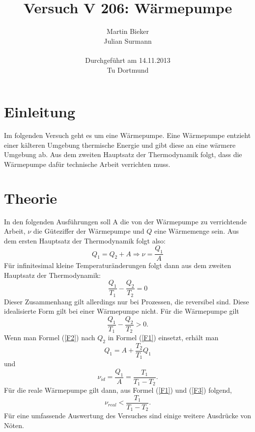 \documentclass[11pt]{article}
\title{\textbf{Versuch V 206: Wärmepumpe}}
\author{Martin Bieker\\
		Julian Surmann\\
		\\
		Durchgef\"{u}hrt am 14.11.2013\\
		Tu Dortmund}
\date{}
\begin{document}
\renewcommand\tablename{Tabelle}
\renewcommand\figurename{Abbildung}
\maketitle
\thispagestyle{empty}
\newpage
\clearpage
\setcounter{page}{1}


\section{Einleitung}
Im folgenden Versuch geht es um eine Wärmepumpe. Eine Wärmepumpe entzieht einer kälteren Umgebung thermische Energie und gibt diese an eine wärmere Umgebung ab. Aus dem zweiten Hauptsatz der Thermodynamik folgt, dass die Wärmepumpe dafür technische Arbeit verrichten muss.
\section{Theorie}
In den folgenden Ausführungen soll A die von der Wärmepumpe zu verrichtende Arbeit, $\nu$ die Güteziffer der Wärmepumpe und $Q$ eine Wärmemenge sein. Aus dem ersten Hauptsatz der Thermodynamik folgt also:
\begin{equation}
\label{F1}
Q_1 = Q_2 + A \Rightarrow \nu = \frac{Q_1}{A}
\end{equation}
Für infinitesimal kleine Temperaturänderungen folgt dann aus dem zweiten Hauptsatz der Thermodynamik:
\begin{equation}
\label{F2}
\frac{Q_1}{T_1} - \frac{Q_2}{T_2} = 0
\end{equation}
Dieser Zusammenhang gilt allerdings nur bei Prozessen, die reversibel sind. Diese idealisierte Form gilt bei einer Wärmepumpe nicht. Für die Wärmepumpe gilt
\begin{equation}
\label{F3}
\frac{Q_1}{T_1} - \frac{Q_2}{T_2} > 0.
\end{equation}
Wenn man Formel (\ref{F2}) nach $Q_2$ in Formel (\ref{F1}) einsetzt, erhält man
\begin{equation}
\label{F4}
Q_1 = A + \frac{T_2}{T_1} Q_1
\end{equation}
und
\begin{equation}
\label{F5}
\nu_{id} = \frac{Q_1}{A} = \frac{T_1}{T_1-T_2}.
\end{equation}
Für die reale Wärmepumpe gilt dann, aus Formel (\ref{F1}) und (\ref{F3}) folgend,
\begin{equation}
\label{F6}
\nu_{real} < \frac{T_1}{T_1-T_2}.
\end{equation}
Für eine umfassende Auswertung des Versuches sind einige weitere Ausdrücke von Nöten.
\end{document}
